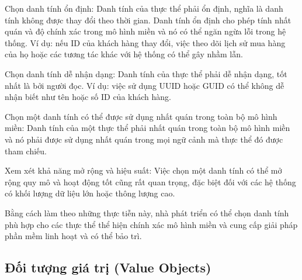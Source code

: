 Chọn danh tính ổn định: Danh tính của thực thể phải ổn định, nghĩa là danh tính không được thay đổi theo thời gian. Danh tính ổn định cho phép tính nhất quán và độ chính xác trong mô hình miền và nó có thể ngăn ngừa lỗi trong hệ thống. Ví dụ: nếu ID của khách hàng thay đổi, việc theo dõi lịch sử mua hàng của họ hoặc các tương tác khác với hệ thống có thể gây nhầm lẫn.

Chọn danh tính dễ nhận dạng: Danh tính của thực thể phải dễ nhận dạng, tốt nhất là bởi người đọc. Ví dụ: việc sử dụng UUID hoặc GUID có thể không dễ nhận biết như tên hoặc số ID của khách hàng.

Chọn một danh tính có thể được sử dụng nhất quán trong toàn bộ mô hình miền: Danh tính của một thực thể phải nhất quán trong toàn bộ mô hình miền và nó phải được sử dụng nhất quán trong mọi ngữ cảnh mà thực thể đó được tham chiếu.

Xem xét khả năng mở rộng và hiệu suất: Việc chọn một danh tính có thể mở rộng quy mô và hoạt động tốt cũng rất quan trọng, đặc biệt đối với các hệ thống có khối lượng dữ liệu lớn hoặc thông lượng cao.

Bằng cách làm theo những thực tiễn này, nhà phát triển có thể chọn danh tính phù hợp cho các thực thể thể hiện chính xác mô hình miền và cung cấp giải pháp phần mềm linh hoạt và có thể bảo trì.





\subsection{Đối tượng giá trị (Value Objects)}





